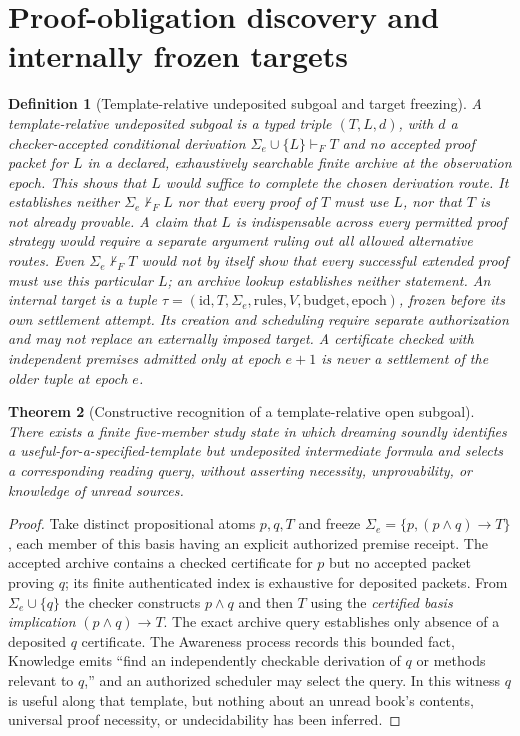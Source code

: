 \documentclass[11pt]{article}
\newtheorem{theorem}{Theorem}[section]
\newtheorem{definition}[theorem]{Definition}
\begin{document}
\section{Proof-obligation discovery and internally frozen targets}
\begin{definition}[Template-relative undeposited subgoal and target freezing]
A \emph{template-relative undeposited subgoal} is a typed triple $(T,L,d)$, with $d$ a checker-accepted conditional derivation $\Sigma_e\cup\{L\}\vdash_F T$ and no accepted proof packet for $L$ in a declared, exhaustively searchable \emph{finite} archive at the observation epoch. This shows that $L$ would suffice to complete the chosen derivation route. It establishes neither $\Sigma_e\nvdash_F L$ nor that \emph{every} proof of $T$ must use $L$, nor that $T$ is not already provable. A claim that $L$ is indispensable across every permitted proof strategy would require a separate argument ruling out all allowed alternative routes. Even $\Sigma_e\nvdash_F T$ would not by itself show that every successful extended proof must use this particular $L$; an archive lookup establishes neither statement. An internal target is a tuple $\tau=(\mathrm{id},T,\Sigma_e,\mathrm{rules},V,\mathrm{budget},\mathrm{epoch})$, frozen \emph{before} its own settlement attempt. Its creation and scheduling require separate authorization and may not replace an externally imposed target. A certificate checked with independent premises admitted only at epoch $e+1$ is never a settlement of the older tuple at epoch $e$.
\end{definition}
\begin{theorem}[Constructive recognition of a template-relative open subgoal]
There exists a finite five-member study state in which dreaming soundly identifies a useful-for-a-specified-template but undeposited intermediate formula and selects a corresponding reading query, without asserting necessity, unprovability, or knowledge of unread sources.
\end{theorem}
\begin{proof}Take distinct propositional atoms $p,q,T$ and freeze $\Sigma_e=\{p,(p\land q)\to T\}$, each member of this basis having an explicit authorized premise receipt. The accepted archive contains a checked certificate for $p$ but no accepted packet proving $q$; its finite authenticated index is exhaustive for deposited packets. From $\Sigma_e\cup\{q\}$ the checker constructs $p\land q$ and then $T$ using the \emph{certified basis implication} $(p\land q)\to T$. The exact archive query establishes only absence of a deposited $q$ certificate. The Awareness process records this bounded fact, Knowledge emits ``find an independently checkable derivation of $q$ or methods relevant to $q$,'' and an authorized scheduler may select the query. In this witness $q$ is useful along that template, but nothing about an unread book's contents, universal proof necessity, or undecidability has been inferred.\end{proof}
\end{document}

